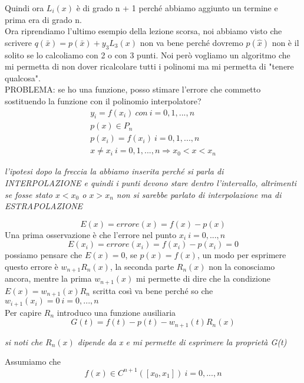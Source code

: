 \documentclass[a4paper, portrait]{book}
\numberwithin{equation}{chapter} %
\begin{document}
Quindi ora $L_i(x)$ è di grado n + 1 perché abbiamo aggiunto un termine e prima era di grado n.\\
Ora riprendiamo l'ultimo esempio della lezione scorsa, noi abbiamo visto che scrivere $q(\bar{x}) = p(\bar{x})+y_3 L_3(x)$ non va bene perché dovremo $p(\hat{x})$ non è il solito se lo calcoliamo con 2 o con 3 punti. Noi però vogliamo un algoritmo che mi permetta di non dover ricalcolare tutti i polinomi ma mi permetta di "tenere qualcosa".\\
PROBLEMA: se ho una funzione, posso stimare l'errore che commetto sostituendo la funzione con il polinomio interpolatore?
\begin{gather}
    y_i = f(x_i) \ con \ i = 0,1,...,n\\
    p(x) \in P_n\\
    p(x_i) = f(x_i) \ i = 0,1,...,n\\
    x \neq x_i \ i = 0,1,...,n \Rightarrow x_0 < x < x_n
\end{gather}
\begin{center}
    \textit{l'ipotesi dopo la freccia la abbiamo inserita perché si parla di INTERPOLAZIONE e quindi i punti devono stare dentro l'intervallo, altrimenti se fosse stato $x < x_0$ o $x>x_n$ non si sarebbe parlato di interpolazione ma di ESTRAPOLAZIONE} 
\end{center}
\begin{equation}
    E(x) = errore(x) = f(x) - p(x)
\end{equation}
Una prima osservazione è che l'errore nel punto $x_i \ i = 0,...,n$
\begin{equation}
    E(x_i) = errore(x_i) = f(x_i) - p(x_i) = 0
\end{equation}
possiamo pensare che $E(x) = 0$, se $p(x) = f(x)$, un modo per esprimere questo errore è $w_{n+1}R_n(x)$, la seconda parte $R_n(x)$ non la conosciamo ancora, mentre la prima $w_{n+1}(x)$ mi permette di dire che la condizione $E(x) = w_{n+1}(x)R_n$ scritta così va bene perché so che $w_{i+1}(x_i)=0 \ i = 0,...,n$\\
Per capire $R_n$ introduco una funzione ausiliaria
\begin{equation}
    G(t) = f(t) - p(t) -w_{n+1}(t) R_n(x)
\end{equation}
\begin{center}
    \textit{si noti che $R_n(x)$ dipende da x e mi permette di esprimere la proprietà G(t)}
\end{center}
Assumiamo che 
\begin{equation}
    f(x) \in C^{n+1}([x_0,x_1]) \ i = 0,...,n
\end{equation}
\end{document}
